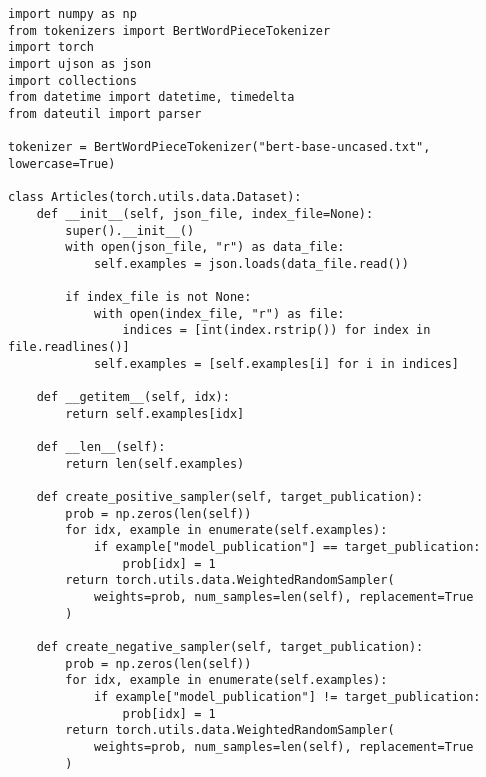 \begin{verbatim}
import numpy as np
from tokenizers import BertWordPieceTokenizer
import torch
import ujson as json
import collections
from datetime import datetime, timedelta
from dateutil import parser

tokenizer = BertWordPieceTokenizer("bert-base-uncased.txt", lowercase=True)

class Articles(torch.utils.data.Dataset):
    def __init__(self, json_file, index_file=None):
        super().__init__()
        with open(json_file, "r") as data_file:
            self.examples = json.loads(data_file.read())

        if index_file is not None:
            with open(index_file, "r") as file:
                indices = [int(index.rstrip()) for index in file.readlines()]
            self.examples = [self.examples[i] for i in indices]

    def __getitem__(self, idx):
        return self.examples[idx]

    def __len__(self):
        return len(self.examples)

    def create_positive_sampler(self, target_publication):
        prob = np.zeros(len(self))
        for idx, example in enumerate(self.examples):
            if example["model_publication"] == target_publication:
                prob[idx] = 1
        return torch.utils.data.WeightedRandomSampler(
            weights=prob, num_samples=len(self), replacement=True
        )

    def create_negative_sampler(self, target_publication):
        prob = np.zeros(len(self))
        for idx, example in enumerate(self.examples):
            if example["model_publication"] != target_publication:
                prob[idx] = 1
        return torch.utils.data.WeightedRandomSampler(
            weights=prob, num_samples=len(self), replacement=True
        )


\end{verbatim}
